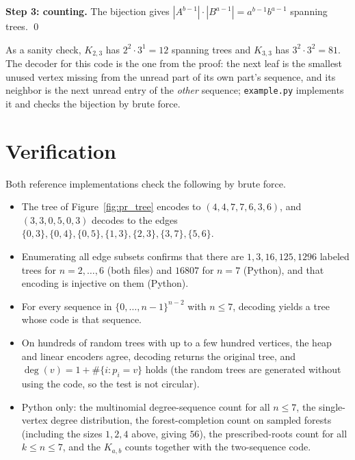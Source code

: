 \documentclass[11pt]{article}
\begin{document}
\begin{theorembox}
\textbf{Step 3: counting.} The bijection gives
$|A^{b-1}|\cdot|B^{a-1}|=a^{b-1}b^{a-1}$ spanning trees. \qed
\end{theorembox}

As a sanity check, $K_{2,3}$ has $2^2\cdot3^1=12$ spanning trees and
$K_{3,3}$ has $3^2\cdot3^2=81$. The decoder for this code is the one
from the proof: the next leaf is the smallest unused vertex missing from
the unread part of its own part's sequence, and its neighbor is the next
unread entry of the \emph{other} sequence; \texttt{example.py} implements
it and checks the bijection by brute force.

\section{Verification}\label{sec:verify}
Both reference implementations check the following by brute force.
\begin{itemize}[leftmargin=1.5em,itemsep=1pt]
  \item The tree of Figure~\ref{fig:pr_tree} encodes to
        $(4,4,7,7,6,3,6)$, and $(3,3,0,5,0,3)$ decodes to the edges
        $\{0,3\},\{0,4\},\{0,5\},\{1,3\},\{2,3\},\{3,7\},\{5,6\}$.
  \item Enumerating all edge subsets confirms that there are
        $1,3,16,125,1296$ labeled trees for $n=2,\dots,6$ (both files) and
        $16807$ for $n=7$ (Python), and that encoding is injective on
        them (Python).
  \item For every sequence in $\{0,\dots,n-1\}^{n-2}$ with $n\le7$,
        decoding yields a tree whose code is that sequence.
  \item On hundreds of random trees with up to a few hundred vertices, the heap and
        linear encoders agree, decoding returns the original tree, and
        $\deg(v)=1+\#\{i:p_i=v\}$ holds (the random trees are generated
        without using the code, so the test is not circular).
  \item Python only: the multinomial degree-sequence count for all $n\le7$,
        the single-vertex degree distribution, the forest-completion count
        on sampled forests (including the sizes $1,2,4$ above, giving
        $56$), the prescribed-roots count for all $k\le n\le7$, and the
        $K_{a,b}$ counts together with the two-sequence code.
\end{itemize}
\end{document}
